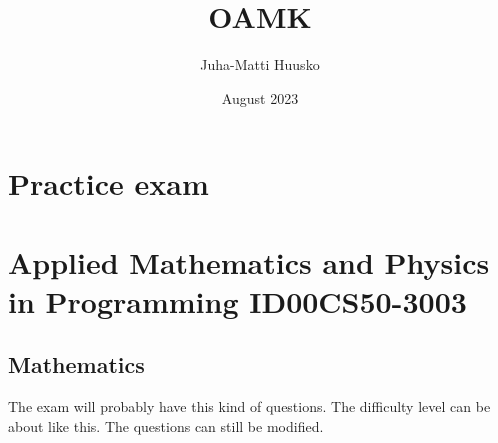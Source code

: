 \documentclass[12pt]{article}
\title{OAMK}
\author{Juha-Matti Huusko}
\date{August 2023}
\begin{document}
\thispagestyle{empty}

\section*{Practice exam}
\section*{Applied Mathematics and Physics in Programming ID00CS50-3003}
\subsection*{Mathematics}

The exam will probably have this kind of questions. The difficulty level can be about like this. The questions can still be modified.
\end{document}
